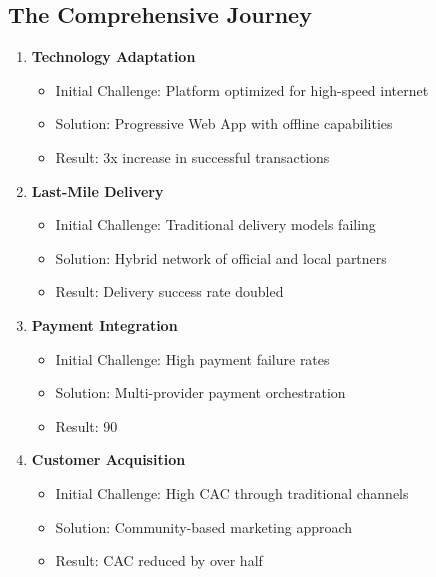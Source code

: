 \subsection{The Comprehensive Journey}\label{subsec:the-comprehensive-journey}
\begin{tcolorbox}[colback=white,colframe=primarydark,title=\textbf{Mike's Challenge Areas}]
\begin{enumerate}
    \item \textbf{Technology Adaptation}
    \begin{itemize}
        \item Initial Challenge: Platform optimized for high-speed internet
        \item Solution: Progressive Web App with offline capabilities
        \item Result: 3x increase in successful transactions
    \end{itemize}

    \item \textbf{Last-Mile Delivery}
    \begin{itemize}
        \item Initial Challenge: Traditional delivery models failing
        \item Solution: Hybrid network of official and local partners
        \item Result: Delivery success rate doubled
    \end{itemize}

    \item \textbf{Payment Integration}
    \begin{itemize}
        \item Initial Challenge: High payment failure rates
        \item Solution: Multi-provider payment orchestration
        \item Result: 90%
    \end{itemize}

    \item \textbf{Customer Acquisition}
    \begin{itemize}
        \item Initial Challenge: High CAC through traditional channels
        \item Solution: Community-based marketing approach
        \item Result: CAC reduced by over half
    \end{itemize}
\end{enumerate}
\end{tcolorbox}

